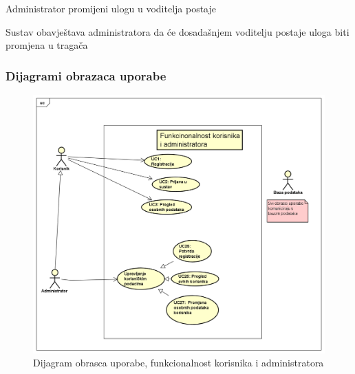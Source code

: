 \begin{packed_item}
\begin{packed_item}
							\item[4.b] Administrator promijeni ulogu u voditelja postaje
							\item[] \begin{packed_enum}
								
								\item Sustav obavještava administratora da će dosadašnjem voditelju postaje uloga biti promjena u tragača
								
							\end{packed_enum}
							
						\end{packed_item}
					\end{packed_item}
					
				\eject
					
					
				\subsubsection{Dijagrami obrazaca uporabe}
					\begin{figure}[H]
						\includegraphics[scale=0.4]{dijagrami/Korisnik-admin_dijagram.png} 
						\centering
						\caption{Dijagram obrasca uporabe, funkcionalnost korisnika i administratora}
						\label{fig:promjene}
					\end{figure}	
					
